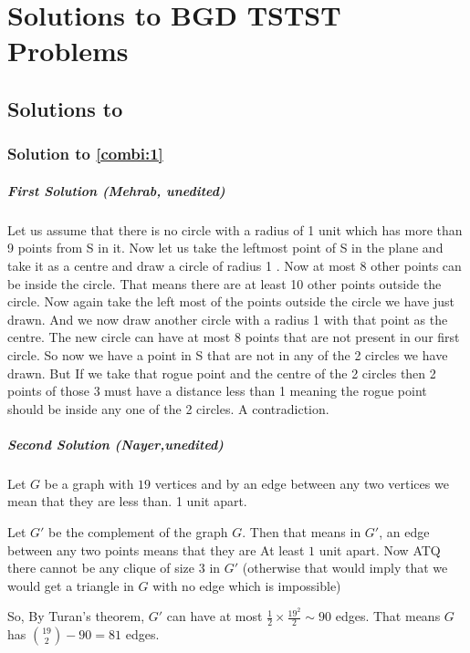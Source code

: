 \chapter{Solutions to BGD TSTST Problems}\label{sols:tstst}


\section{Solutions to }

\subsection*{Solution to \autoref{combi:1}}
\paragraph{First Solution (Mehrab, unedited)}
Let us assume that there is no circle with a radius of 1  unit which has more than 9  points from S  in it. Now let us take the leftmost point of S  in the plane and take it as a centre and draw a circle of radius 1 . Now at most 8 other points can be inside the circle. That means there are at least 10  other points outside the circle. Now again take the left most of the points outside the circle we have just drawn. And we now draw another circle with a radius 1  with that point as the centre. The new circle can have at most 8 points that are not present in our first circle. So now we have a point in S  that are not in any of the 2 circles we have drawn. But If we take that rogue point and the centre of the 2 circles then 2 points of those 3 must have a distance less than 1  meaning the rogue point should be inside any one of the 2 circles. A contradiction. 


\paragraph{Second Solution (Nayer,unedited)}
Let $G$ be a graph with $19$ vertices and by an edge between any two vertices we mean that they are less than. 1 unit apart.

Let $G'$ be the complement of the graph $G$. Then that means in $G'$, an edge between any two points means that they are At least $1$ unit apart. Now ATQ there cannot be any clique of size $3$  in $G'$ (otherwise that would imply that we would get a triangle in
$G$ with no edge which is impossible)

So, By Turan's theorem, $G'$ can have at most $\frac{1}{2}\times \frac{19^2}{2} \sim 90 $ edges. That means $G$ has $\binom{19}{2}−90 =81$  edges.


